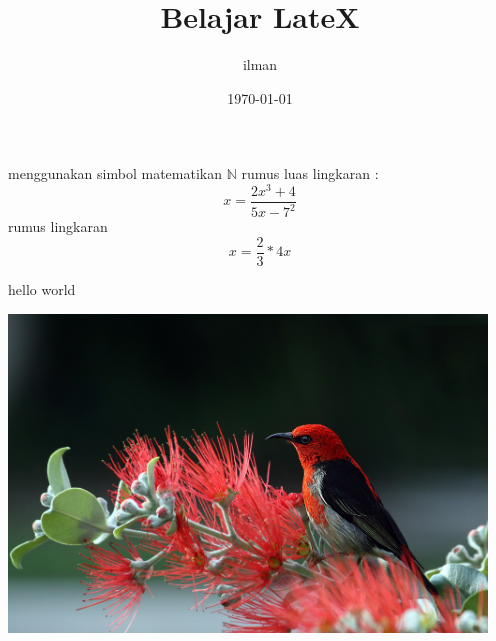\documentclass[11pt]{article}
\def\rumus1{x=\frac{2}{3}*4x}
\def\helloWorld{hello world}
\begin{document}
	\title{Belajar LateX}
	\author{ilman}
	\date{\today}
	\maketitle
	menggunakan simbol matematikan $\mathbb{N}$
	rumus luas lingkaran : 
	$$x=\frac{2x^3+4}{5x-7^2}$$
	rumus lingkaran  
	$$\rumus1$$
	
	\helloWorld
	
	\begin{center}
		\includegraphics[width=5in]{animal-animal-photography-daylight-36762.jpg}

	\end{center}
\end{document}

